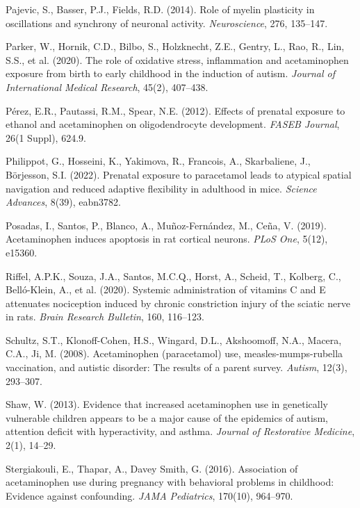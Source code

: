 \documentclass[12pt]{article}
\begin{document}
\begin{thebibliography}{99}
Pajevic, S., Basser, P.J., Fields, R.D. (2014).
Role of myelin plasticity in oscillations and synchrony of neuronal activity.
\textit{Neuroscience}, 276, 135--147.

Parker, W., Hornik, C.D., Bilbo, S., Holzknecht, Z.E., Gentry, L., Rao, R., Lin, S.S., et al. (2020).
The role of oxidative stress, inflammation and acetaminophen exposure from birth to early childhood in the induction of autism.
\textit{Journal of International Medical Research}, 45(2), 407--438.

Pérez, E.R., Pautassi, R.M., Spear, N.E. (2012).
Effects of prenatal exposure to ethanol and acetaminophen on oligodendrocyte development.
\textit{FASEB Journal}, 26(1 Suppl), 624.9.

Philippot, G., Hosseini, K., Yakimova, R., Francois, A., Skarbaliene, J., Börjesson, S.I. (2022).
Prenatal exposure to paracetamol leads to atypical spatial navigation and reduced adaptive flexibility in adulthood in mice.
\textit{Science Advances}, 8(39), eabn3782.

Posadas, I., Santos, P., Blanco, A., Muñoz-Fernández, M., Ceña, V. (2019).
Acetaminophen induces apoptosis in rat cortical neurons.
\textit{PLoS One}, 5(12), e15360.

Riffel, A.P.K., Souza, J.A., Santos, M.C.Q., Horst, A., Scheid, T., Kolberg, C., Belló-Klein, A., et al. (2020).
Systemic administration of vitamins C and E attenuates nociception induced by chronic constriction injury of the sciatic nerve in rats.
\textit{Brain Research Bulletin}, 160, 116--123.

Schultz, S.T., Klonoff-Cohen, H.S., Wingard, D.L., Akshoomoff, N.A., Macera, C.A., Ji, M. (2008).
Acetaminophen (paracetamol) use, measles-mumps-rubella vaccination, and autistic disorder: The results of a parent survey.
\textit{Autism}, 12(3), 293--307.

Shaw, W. (2013).
Evidence that increased acetaminophen use in genetically vulnerable children appears to be a major cause of the epidemics of autism, attention deficit with hyperactivity, and asthma.
\textit{Journal of Restorative Medicine}, 2(1), 14--29.

Stergiakouli, E., Thapar, A., Davey Smith, G. (2016).
Association of acetaminophen use during pregnancy with behavioral problems in childhood: Evidence against confounding.
\textit{JAMA Pediatrics}, 170(10), 964--970.


\end{thebibliography}
\end{document}
